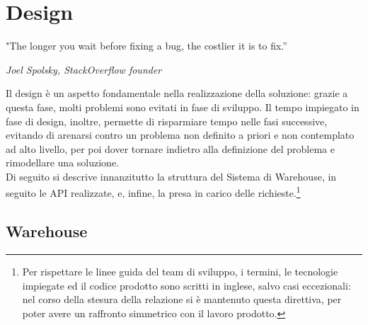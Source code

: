 \chapter{Design}

\epigraph{"The longer you wait before fixing a bug, the costlier it is to fix.”}{\textit{Joel Spolsky, StackOverflow founder}}

\begin{flushleft}
\end{flushleft}
Il design è un aspetto fondamentale nella realizzazione della soluzione: grazie a questa fase, molti problemi sono evitati in fase di sviluppo. Il tempo impiegato in fase di design, inoltre, permette di risparmiare tempo nelle fasi successive, evitando di arenarsi contro un problema non definito a priori e non contemplato ad alto livello, per poi dover tornare indietro alla definizione del problema e rimodellare una soluzione.\\
Di seguito si descrive innanzitutto la struttura del Sistema di Warehouse, in seguito le API realizzate, e, infine, la presa in carico delle richieste.\footnote{Per rispettare le linee guida del team di sviluppo, i termini, le tecnologie impiegate ed il codice prodotto sono scritti in inglese, salvo casi eccezionali: nel corso della stesura della relazione si è mantenuto questa direttiva, per poter avere un raffronto simmetrico con il lavoro prodotto.}

\section{Warehouse} \label{warehousedesign}

